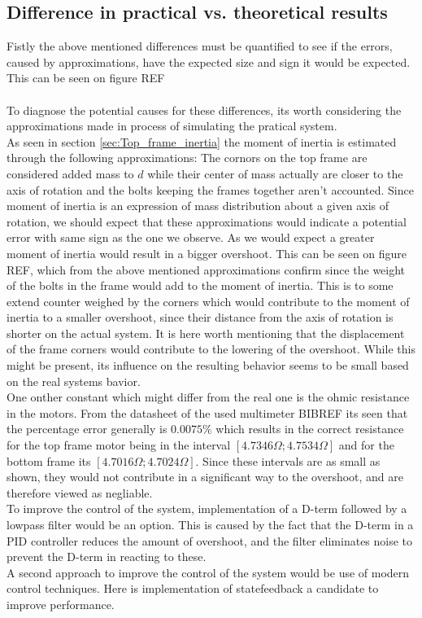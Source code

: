 \documentclass[../../main]{subfiles}
\begin{document}
\subsection{Difference in practical vs. theoretical results}
Fistly the above mentioned differences must be quantified to see if the errors, caused by approximations, have the expected size and sign it would be expected. This can be seen on figure REF\\
\\
To diagnose the potential causes for these differences, its worth considering the approximations made in process of simulating the pratical system.\\
As seen in section \ref{sec:Top_frame_inertia} the moment of inertia is estimated through the following approximations: The cornors on the top frame are considered added mass to $d$ while their center of mass actually are closer to the axis of rotation and the bolts keeping the frames together aren't accounted. Since moment of inertia is an expression of mass distribution about a given axis of rotation, we should expect that these approximations would indicate a potential error with same sign as the one we observe. As we would expect a greater moment of inertia would result in a bigger overshoot. This can be seen on figure REF, which from the above mentioned approximations confirm since the weight of the bolts in the frame would add to the moment of inertia. This is to some extend counter weighed by the corners which would contribute to the moment of inertia to a smaller overshoot, since their distance from the axis of rotation is shorter on the actual system. It is here worth mentioning that the displacement of the frame corners would contribute to the lowering of the overshoot. While this might be present, its influence on the resulting behavior seems to be small based on the real systems bavior.\\
One onther constant which might differ from the real one is the ohmic resistance in the motors. From the datasheet of the used multimeter BIBREF its seen that the percentage error generally is $0.0075\%$ which results in the correct resistance for the top frame motor being in the interval $[4.7346\Omega;4.7534\Omega]$ and for the bottom frame its $[4.7016\Omega;4.7024\Omega]$. Since these intervals are as small as shown, they would not contribute in a significant way to the overshoot, and are therefore viewed as negliable.\\

To improve the control of the system, implementation of a D-term followed by a lowpass filter would be an option. This is caused by the fact that the D-term in a PID controller reduces the amount of overshoot, and the filter eliminates noise to prevent the D-term in reacting to these.\\
A second approach to improve the control of the system would be use of modern control techniques. Here is implementation of statefeedback a candidate to improve performance.
\end{document}
